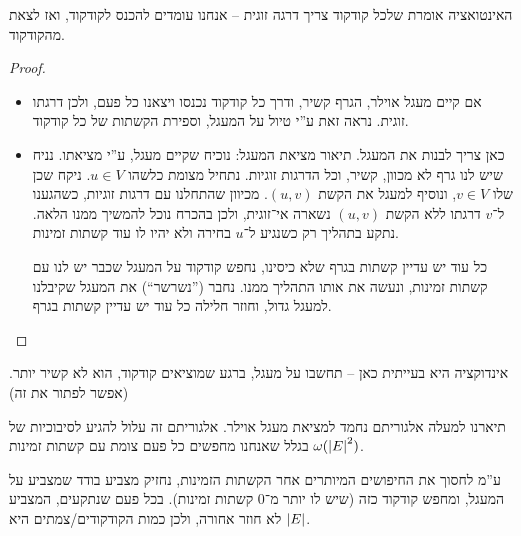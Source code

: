 \documentclass[]{../../../../tex/classes/styledArticle}
\begin{document}
	
	האינטואציה אומרת שלכל קודקוד צריך דרגה זוגית – אנחנו עומדים להכנס לקודקוד, ואז לצאת מהקודקוד. 
	\begin{proof}
		\begin{itemize}
			\item[$\implies$]אם קיים מעגל אוילר, הגרף קשיר, ודרך כל קודקוד נכנסו ויצאנו כל פעם, ולכן דרגתו זוגית. נראה זאת ע''י טיול על המעגל, וספירת הקשתות של כל קודקוד. 
			\item[$\impliedby$]כאן צריך לבנות את המעגל. תיאור מציאת המעגל: 
				נוכיח שקיים מעגל, ע''י מציאתו. נניח שיש לנו גרף לא מכוון, קשיר, וכל הדרגות זוגיות. נתחיל מצומת כלשהו $u \in V$. ניקח שכן שלו $v \in V$, ונוסיף למעגל את הקשת $(u, v)$. מכיוון שהתחלנו עם דרגות זוגיות, כשהגענו ל־$v$ דרגתו ללא הקשת $(u, v)$ נשארה אי־זוגית, ולכן בהכרח נוכל להמשיך ממנו הלאה. נתקע בתהליך רק כשנגיע ל־$u$ בחירה ולא יהיו לו עוד קשתות זמינות. 
				
				כל עוד יש עדיין קשתות בגרף שלא כיסינו, נחפש קודקוד על המעגל שכבר יש לנו עם קשתות זמינות, ונעשה את אותו התהליך ממנו. נחבר (''נשרשר``) את המעגל שקיבלנו למעגל גדול, וחוזר חלילה כל עוד יש עדיין קשתות בגרף. 
		\end{itemize}
	\end{proof}
	אינדוקציה היא בעייתית כאן – תחשבו על מעגל, ברגע שמוציאים קודקוד, הוא לא קשיר יותר. (אפשר לפתור את זה)
	
	תיארנו למעלה אלגוריתם נחמד למציאת מעגל אוילר. אלגוריתם זה עלול להגיע לסיבוכיות של $\omega(\left \lvert E \right \rvert^{2})$ בגלל שאנחנו מחפשים כל פעם צומת עם קשתות זמינות. 
	
	ע''מ לחסוך את החיפושים המיותרים אחר הקשתות הזמינות, נחזיק מצביע בודד שמצביע על המעגל, ומחפש קודקוד כזה (שיש לו יותר מ־0 קשתות זמינות). בכל פעם שנתקעים, המצביע לא חוזר אחורה, ולכן כמות הקודקודים/צמתים היא $\left \lvert E \right \rvert$. 
	
\end{document}
